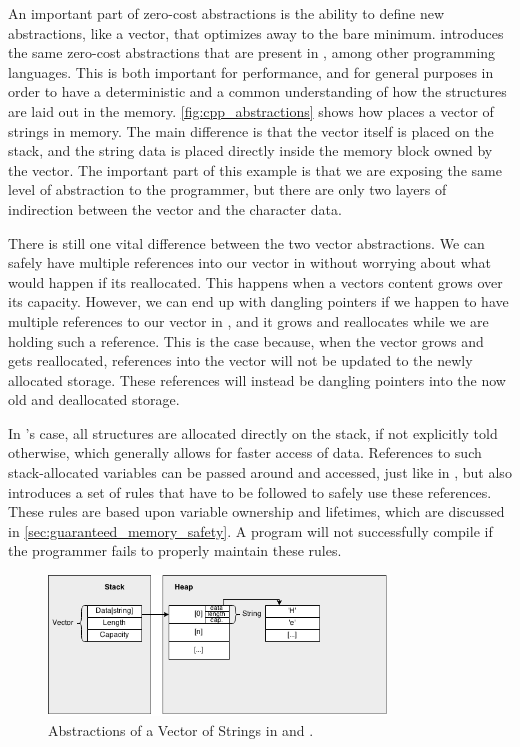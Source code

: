 An important part of zero-cost abstractions is the ability to define new abstractions, like a vector, that optimizes away to the bare minimum.
{\rust} introduces the same zero-cost abstractions that are present in {\Cpp}, among other programming languages.
This is both important for performance, and for general purposes in order to have a deterministic and a common understanding of how the structures are laid out in the memory.
\autoref{fig:cpp_abstractions} shows how {\Cpp} places a vector of strings in memory.
The main difference is that the vector itself is placed on the stack, and the string data is placed directly inside the memory block owned by the vector.
The important part of this example is that we are exposing the same level of abstraction to the programmer, but there are only two layers of indirection between the vector and the character data.

There is still one vital difference between the two vector abstractions.
We can safely have multiple references into our vector in {\Java} without worrying about what would happen if its reallocated.
This happens when a vectors content grows over its capacity.
However, we can end up with dangling pointers if we happen to have multiple references to our vector in {\Cpp}, and it grows and reallocates while we are holding such a reference.
This is the case because, when the vector grows and gets reallocated, references into the vector will not be updated to the newly allocated storage.
These references will instead be dangling pointers into the now old and deallocated storage.

In {\rust}'s case, all structures are allocated directly on the stack, if not explicitly told otherwise, which generally allows for faster access of data.
References to such stack-allocated variables can be passed around and accessed, just like in {\Cpp},
but {\rust} also introduces a set of rules that have to be followed to safely use these references.
These rules are based upon variable ownership and lifetimes, which are discussed in \autoref{sec:guaranteed_memory_safety}.
A {\rust} program will not successfully compile if the programmer fails to properly maintain these rules.

\begin{figure}[tb]
  \begin{center}
    \includegraphics[width=0.8\textwidth]{figures/cpp_abstractions}
  \end{center}
  \caption{Abstractions of a Vector of Strings in {\rust} and {\Cpp}.}
  \label{fig:cpp_abstractions}
\end{figure}

